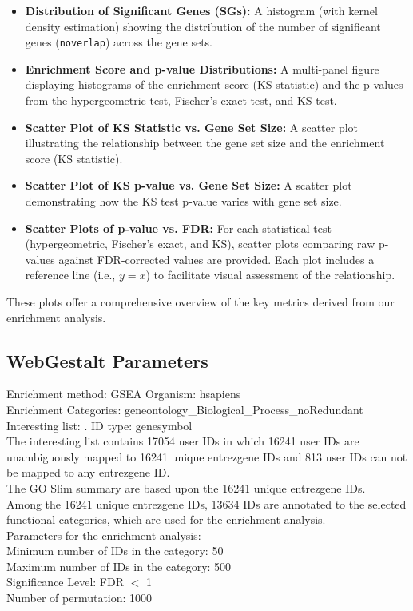 \documentclass{article}
\begin{document}
    \begin{itemize}
        \item \textbf{Distribution of Significant Genes (SGs):} A histogram (with kernel density estimation) showing the distribution of the number of significant genes (\texttt{noverlap}) across the gene sets.
        \item \textbf{Enrichment Score and p-value Distributions:} A multi-panel figure displaying histograms of the enrichment score (KS statistic) and the p-values from the hypergeometric test, Fischer's exact test, and KS test.
        \item \textbf{Scatter Plot of KS Statistic vs. Gene Set Size:} A scatter plot illustrating the relationship between the gene set size and the enrichment score (KS statistic).
        \item \textbf{Scatter Plot of KS p-value vs. Gene Set Size:} A scatter plot demonstrating how the KS test p-value varies with gene set size.
        \item \textbf{Scatter Plots of p-value vs. FDR:} For each statistical test (hypergeometric, Fischer's exact, and KS), scatter plots comparing raw p-values against FDR-corrected values are provided. Each plot includes a reference line (i.e., $y=x$) to facilitate visual assessment of the relationship.
    \end{itemize}

    These plots offer a comprehensive overview of the key metrics derived from our enrichment analysis.

    \subsection{WebGestalt Parameters}\label{subsec:webgestalt-paramaters}
    Enrichment method: GSEA Organism: hsapiens\\
    Enrichment Categories: geneontology\_Biological\_Process\_noRedundant\\
    Interesting list: . ID type: genesymbol\\
    The interesting list contains 17054 user IDs in which 16241 user IDs are unambiguously mapped to 16241 unique entrezgene IDs and 813 user IDs can not be mapped to any entrezgene ID.\\
    The GO Slim summary are based upon the 16241 unique entrezgene IDs.\\
    Among the 16241 unique entrezgene IDs, 13634 IDs are annotated to the selected functional categories, which are used for the enrichment analysis.\\
    Parameters for the enrichment analysis:\\

    Minimum number of IDs in the category: 50\\
    Maximum number of IDs in the category: 500\\
    Significance Level: FDR $<$ 1\\
    Number of permutation: 1000\\
    \AtNextBibliography{\small}\nocite{*}
    \printbibliography[heading=bibintoc, title={References}]
\end{document}
